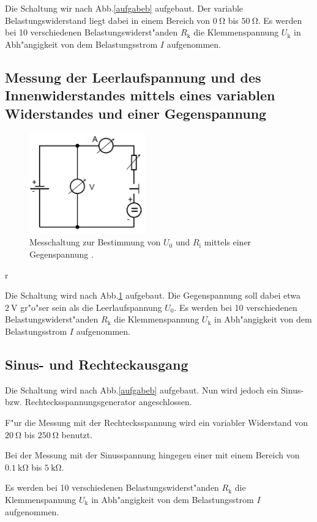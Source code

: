 Die Schaltung wir nach Abb.\ref{aufgabeb} aufgebaut.
Der variable Belastungswiderstand liegt dabei in einem Bereich von $\SI{0}{\ohm}$ bis $\SI{50}{\ohm}$. Es werden bei 10 verschiedenen Belastungswiderst"anden $R_\mathrm{k}$ die Klemmenspannung $U_\mathrm{k}$ in Abh"angigkeit von dem Belastungsstrom $I$ aufgenommen.

\subsection{Messung der Leerlaufspannung und des Innenwiderstandes mittels eines variablen Widerstandes und einer Gegenspannung} %
\label{sub:messung_der_leerlaufspannung_mittels_eines_variablen_widerstandes_}

\begin{figure}
	\centering
	\includegraphics[width = 5cm]{img/c.PNG}
	\caption{Messchaltung zur Bestimmung von $U_\mathrm{0}$ und $R_\mathrm{i}$ mittels einer Gegenspannung \cite{anleitung}.}
	\label{aufgabec}
\end{figure}{r}

Die Schaltung wird nach Abb.\ref{aufgabec} aufgebaut.
Die Gegenspannung soll dabei etwa $\SI{2}{\volt}$ gr"o"ser sein als die Leerlaufspannung $U_\mathrm{0}$.
Es werden bei 10 verschiedenen Belastungswiderst"anden $R_\mathrm{k}$ die Klemmenspannung $U_\mathrm{k}$ in Abh"angigkeit von dem Belastungsstrom $I$ aufgenommen.

\subsection{Sinus- und Rechteckausgang} %
\label{sub:sinus_und_rechteckausgang}

Die Schaltung wird nach Abb.\ref{aufgabeb} aufgebaut.
Nun wird jedoch ein Sinus- bzw. Rechtecksspannungsgenerator angeschlossen.

F"ur die Messung mit der Rechtecksspannung wird ein variabler Widerstand von $\SI{20}{\ohm}$ bis $\SI{250}{\ohm}$ benutzt.

Bei der Messung mit der Sinusspannung hingegen einer mit einem Bereich von $\SI{0.1}{\kilo\ohm}$ bis $\SI{5}{\kilo\ohm}$.

Es werden bei 10 verschiedenen Belastungswiderst"anden $R_\mathrm{k}$ die Klemmenspannung $U_\mathrm{k}$ in Abh"angigkeit von dem Belastungsstrom $I$ aufgenommen.